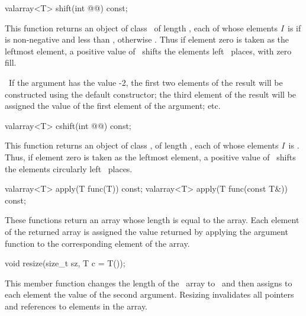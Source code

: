 \documentclass[american,twoside]{book}
\begin{document}
\begin{paras}
%
\begin{itemdecl}
valarray<T> shift(int @@) const;
\end{itemdecl}

\begin{itemdescr}
\pnum
This function returns an object of class
\
of length
,
each of whose elements
\textit{I}\ 
is
if
is non-negative and less than
,
otherwise
.
Thus if element zero is taken as the leftmost element,
a positive value of \ shifts the elements left \
places, with zero fill.

\pnum
\enterexample\ 
If the argument has the value -2,
the first two elements of the result will be constructed using the default
constructor; the third element of the result will be assigned the value
of the first element of the argument; etc.
\exitexample\ 
%
\begin{itemdecl}
valarray<T> cshift(int @\farg{n}@) const;
\end{itemdecl}

\pnum
This function returns an object of class
\tcode{valarray<T>},
of length
,
each of whose elements
\textit{I}\ 
is
.
Thus, if element zero is taken as the leftmost element,
a positive value of \ shifts the elements circularly
left \farg{n}\ places.
\end{itemdescr}

%
\begin{itemdecl}
valarray<T> apply(T func(T)) const;
valarray<T> apply(T func(const T&)) const;
\end{itemdecl}

\begin{itemdescr}
\pnum
These functions return an array whose length is equal to the array.
Each element of the returned array is assigned
the value returned by applying the argument function to the
corresponding element of the array.

%
\begin{itemdecl}
void resize(size_t sz, T c = T());
\end{itemdecl}

\pnum
This member function changes the length of the
\tcode{*this}\
array to
\tcode{sz}\
and then assigns to each element the value of the second argument.
Resizing invalidates all pointers and references to elements in the array.
\end{itemdescr}


\end{paras}
\end{document}
